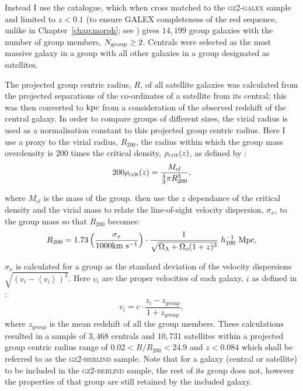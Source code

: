 Instead I use the \citet{berlind06} catalogue, which when cross matched to the \textsc{gz2-galex} sample and limited to $z < 0.1$ (to ensure GALEX completeness of the red sequence, unlike in Chapter~\ref{chap:morph}; see \citealt{Wyder07, Yesuf14}) gives $14,199$ group galaxies with the number of group members, $N_{\rm{group}} \geq 2$. Centrals were selected as the most massive galaxy in a group \citep[as in][]{yang07, yang09, pasquali10} with all other galaxies in a group designated as satellites.

The projected group centric radius, $R$, of all satellite galaxies was calculated from the projected separations of the co-ordinates of a satellite from its central; this was then converted to $\rm{kpc}$ from a consideration of the observed redshift of the central galaxy. In order to compare groups of different sizes, the virial radius is used as a normalisation constant to this projected group centric radius. Here I use a proxy to the virial radius, $R_{200}$\citep[see][]{navarro95}, the radius within which the group mass overdensity is 200 times the critical density, $\rho_{\rm{crit}}(z)$, as defined by \citealt{finn05}:
\begin{equation}\label{eq:overdense}
200\rho_{\rm{crit}}(z) = \frac{M_{cl}}{\frac{4}{3}\pi R_{200}^3},
\end{equation}

where $M_{cl}$ is the mass of the group. \citeauthor{finn05} then use the $z$ dependance of the critical density and the virial mass to relate the line-of-sight velocity dispersion, $\sigma_x$, to the group mass so that $R_{200}$ becomes:
\begin{equation}\label{eq:r200}
R_{200} = 1.73 \left ( \frac{\sigma_x}{1000 \rm{km}~\rm{s}^{-1}} \right) \cdot \frac{1}{\sqrt{\Omega_{\Lambda} +\Omega_o(1+z)^3}} ~ h_{100}^{-1} ~\rm{Mpc}, 
\end{equation}

$\sigma_x$ is calculated for a group as the standard deviation of the velocity dispersions $\sqrt{(v_i - \left< v_i\right>)^2}$. Here $v_i$ are the proper velocities of each galaxy, $i$ as defined in \cite{danese80}:
\begin{equation}\label{eq:propervel}
v_i = c \cdot \frac{z_i - z_{group}}{1 + z_{group}},
\end{equation}
where $z_{group}$ is the mean redshift of all the group members. These calculations resulted in a sample of $3,468$ centrals and $10,731$ satellites within a projected group centric radius range of $0.02 < R/R_{200} < 24.9$ and $z < 0.084$ which shall be referred to as the \textsc{gz2-berlind} sample. Note that for a galaxy (central or satellite) to be included in the \textsc{gz2-berlind} sample, the rest of its group does not, however the properties of that group are still retained by the included galaxy. 

